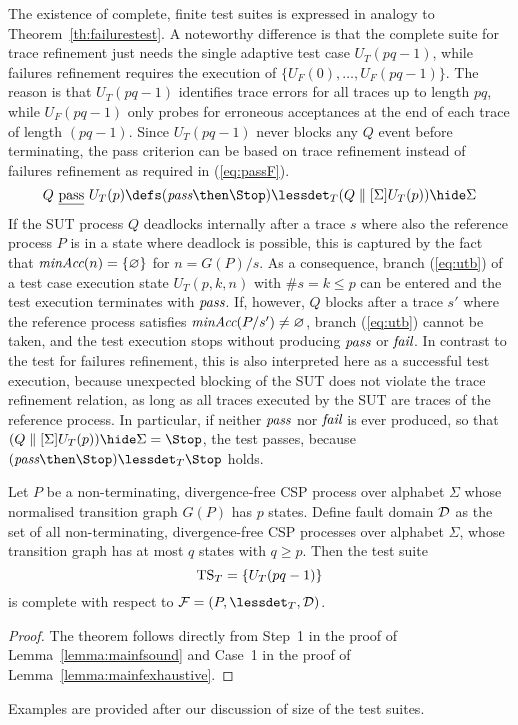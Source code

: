 The existence of complete, finite test suites is expressed in analogy to
Theorem~\ref{th:failurestest}. A noteworthy difference is that the complete
suite for trace refinement just needs the single adaptive test case
$U_T(pq-1)$, while failures refinement requires the execution of $\{
U_F(0),\dots,U_F(pq-1)\}$. The reason is that $U_T(pq-1)$ identifies trace
errors for all traces up to length $pq$, while $U_F(pq-1)$ only probes for
erroneous acceptances at the end of each trace of length $(pq -1)$. Since
$U_T(pq-1)$ never blocks any $Q$ event before terminating, the pass criterion
can be based on trace refinement instead of failures refinement as required
in (\ref{eq:passF}).
%
\begin{equation}
\label{eq:passT}
Q\ \pass\ U_T(p) \defs (\epass\then\Stop) \lessdet_T (Q\parallel[\Sigma] U_T(p)) \hide \Sigma
\end{equation}
%
If the SUT process $Q$ deadlocks internally after a trace $s$ where also the reference
process $P$ is in a state where deadlock is possible, this is captured by the fact
that $\text{\it minAcc}(n) = \{ \varnothing\}$ for $n = G(P)/s$. As a consequence, branch
(\ref{eq:utb}) of a test case execution state $U_T(p,k,n)$  
with $\#s = k \le p$   can be entered
and the  test execution terminates with ${\text{\it pass}}$. If, however,  
$Q$ blocks after a trace $s'$
where the reference process satisfies $\text{\it minAcc}(P/s') \neq\varnothing$, branch 
(\ref{eq:utb})  cannot be taken, and the test execution stops without producing
${\text{\it pass}}$ or ${\text{\it fail}}$. In contrast to the test for failures refinement, this is also interpreted here as a successful test execution, because unexpected blocking
of the SUT does not violate the trace refinement relation, as long as all traces 
executed by the SUT are traces of the reference process. In particular, if 
neither ${\text{\it pass}}$ nor ${\text{\it fail}}$ is ever produced, so that
$(Q\parallel[\Sigma] U_T(p)) \hide \Sigma = \Stop$, the test passes, because
$(\epass\then\Stop) \lessdet_T \Stop$ holds.




\begin{theorem}\label{th:tracetest}
Let $P$ be a non-terminating, divergence-free CSP process over alphabet $\Sigma$ whose
normalised transition graph $G(P)$ has $p$ states. Define fault domain ${\cal
D}$ as the set of all non-terminating, divergence-free CSP processes over alphabet $\Sigma$,
whose transition graph has at most $q$ states with $q \ge p$. Then the test
suite
\[
{\text{TS}}_T = \{ U_T(pq-1)   \}
\]
is complete with respect to ${\cal F} = (P,\lessdet_T,{\cal D})$.
\xbox
\end{theorem}
\begin{proof}
The theorem follows directly
from Step~1 in the proof of Lemma~\ref{lemma:mainfsound} and
Case~1 in the proof of Lemma~\ref{lemma:mainfexhaustive}.
\xbox
\end{proof}
%
Examples are provided after our discussion of size of the test suites.

 
